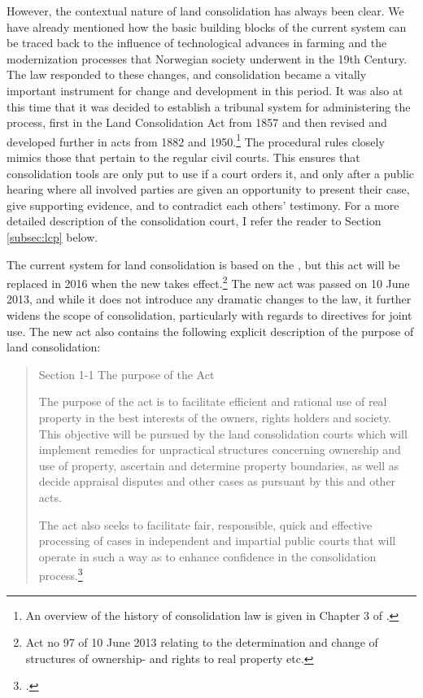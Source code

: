 However, the contextual nature of land consolidation has always been clear. We have already mentioned how the basic building blocks of the current system can be traced back to the influence of technological advances in farming and the modernization processes that Norwegian society underwent in the 19th Century. The law responded to these changes, and consolidation became a vitally important instrument for change and development in this period. It was also at this time that it was decided to establish a tribunal system for administering the process, first in the Land Consolidation Act from 1857 and then revised and developed further in acts from 1882 and 1950.\footnote{An overview of the history of consolidation law is given in Chapter 3 of \cite{prop12}.} The procedural rules closely mimics those that pertain to the regular civil courts. This ensures that consolidation tools are only put to use if a court orders it, and only after a public hearing where all involved parties are given an opportunity to present their case, give supporting evidence, and to contradict each others' testimony. For a more detailed description of the consolidation court, I refer the reader to Section \ref{subsec:lcp} below.

The current system for land consolidation is based on the \cite{lca79}, but this act will be replaced in 2016 when the new \cite{lca13} takes effect.\footnote{Act no 97 of 10 June 2013 relating to the determination and change of structures of ownership- and rights to real property etc.} The new act was passed on 10 June 2013, and while it does not introduce any dramatic changes to the law, it further widens the scope of consolidation, particularly with regards to directives for joint use. The new act also contains the following explicit description of the purpose of land consolidation:

\begin{quote}
Section 1-1 The purpose of the Act

The purpose of the act is to facilitate efficient and rational use of real property in the best interests of the owners, rights holders and society. This objective will be pursued by the land consolidation courts which will implement remedies for unpractical structures concerning ownership and use of property, ascertain and determine property boundaries, as well as decide appraisal disputes and other cases as pursuant by this and other acts.

The act also seeks to facilitate fair, responsible, quick and effective processing of cases in independent and impartial public courts that will operate in such a way as to enhance confidence in the consolidation process.\footcite[1]{lca13}
\end{quote}

